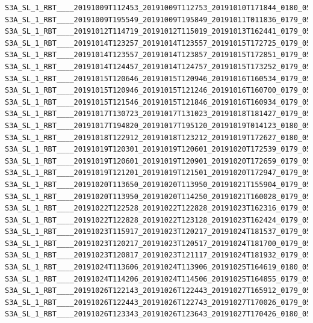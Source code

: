 \documentclass[sigplan,screen]{acmart}
\begin{document}
\begin{verbatim}
S3A_SL_1_RBT____20191009T112453_20191009T112753_20191010T171844_0180_050_137_1980_LN2_O_NT_003.hdf
S3A_SL_1_RBT____20191009T195549_20191009T195849_20191011T011836_0179_050_142_2340_LN2_O_NT_003.hdf
S3A_SL_1_RBT____20191012T114719_20191012T115019_20191013T162441_0179_050_180_1980_LN2_O_NT_003.hdf
S3A_SL_1_RBT____20191014T123257_20191014T123557_20191015T172725_0179_050_209_1800_LN2_O_NT_003.hdf
S3A_SL_1_RBT____20191014T123557_20191014T123857_20191015T172851_0179_050_209_1980_LN2_O_NT_003.hdf
S3A_SL_1_RBT____20191014T124457_20191014T124757_20191015T173252_0179_050_209_2520_LN2_O_NT_003.hdf
S3A_SL_1_RBT____20191015T120646_20191015T120946_20191016T160534_0179_050_223_1800_LN2_O_NT_003.hdf
S3A_SL_1_RBT____20191015T120946_20191015T121246_20191016T160700_0179_050_223_1980_LN2_O_NT_003.hdf
S3A_SL_1_RBT____20191015T121546_20191015T121846_20191016T160934_0179_050_223_2340_LN2_O_NT_003.hdf
S3A_SL_1_RBT____20191017T130723_20191017T131023_20191018T181427_0179_050_252_2520_LN2_O_NT_003.hdf
S3A_SL_1_RBT____20191017T194820_20191017T195120_20191019T014123_0180_050_256_2340_LN2_O_NT_003.hdf
S3A_SL_1_RBT____20191018T122912_20191018T123212_20191019T172627_0180_050_266_1800_LN2_O_NT_003.hdf
S3A_SL_1_RBT____20191019T120301_20191019T120601_20191020T172539_0179_050_280_1800_LN2_O_NT_003.hdf
S3A_SL_1_RBT____20191019T120601_20191019T120901_20191020T172659_0179_050_280_1980_LN2_O_NT_003.hdf
S3A_SL_1_RBT____20191019T121201_20191019T121501_20191020T172947_0179_050_280_2340_LN2_O_NT_003.hdf
S3A_SL_1_RBT____20191020T113650_20191020T113950_20191021T155904_0179_050_294_1800_LN2_O_NT_003.hdf
S3A_SL_1_RBT____20191020T113950_20191020T114250_20191021T160028_0179_050_294_1980_LN2_O_NT_003.hdf
S3A_SL_1_RBT____20191022T122528_20191022T122828_20191023T162316_0179_050_323_1800_LN2_O_NT_003.hdf
S3A_SL_1_RBT____20191022T122828_20191022T123128_20191023T162424_0179_050_323_1980_LN2_O_NT_003.hdf
S3A_SL_1_RBT____20191023T115917_20191023T120217_20191024T181537_0179_050_337_1800_LN2_O_NT_003.hdf
S3A_SL_1_RBT____20191023T120217_20191023T120517_20191024T181700_0179_050_337_1980_LN2_O_NT_003.hdf
S3A_SL_1_RBT____20191023T120817_20191023T121117_20191024T181932_0179_050_337_2340_LN2_O_NT_003.hdf
S3A_SL_1_RBT____20191024T113606_20191024T113906_20191025T164619_0180_050_351_1980_LN2_O_NT_003.hdf
S3A_SL_1_RBT____20191024T114206_20191024T114506_20191025T164855_0179_050_351_2340_LN2_O_NT_003.hdf
S3A_SL_1_RBT____20191026T122143_20191026T122443_20191027T165912_0179_050_380_1800_LN2_O_NT_003.hdf
S3A_SL_1_RBT____20191026T122443_20191026T122743_20191027T170026_0179_050_380_1980_LN2_O_NT_003.hdf
S3A_SL_1_RBT____20191026T123343_20191026T123643_20191027T170426_0180_050_380_2520_LN2_O_NT_003.hdf

\end{verbatim}
\end{document}
